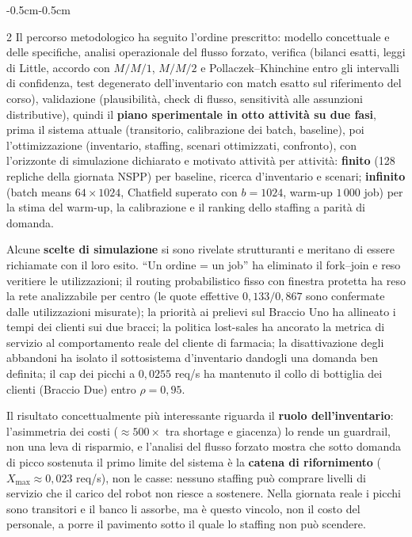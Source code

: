 \documentclass{article}
\begin{document}
\begin{adjustwidth}{-0.5cm}{-0.5cm}
\begin{multicols}{2}
Il percorso metodologico ha seguito l'ordine prescritto: modello concettuale e delle specifiche,
analisi operazionale del flusso forzato, verifica (bilanci esatti, leggi di Little, accordo con
$M/M/1$, $M/M/2$ e Pollaczek--Khinchine entro gli intervalli di confidenza, test degenerato
dell'inventario con match esatto sul riferimento del corso), validazione (plausibilità, check di
flusso, sensitività alle assunzioni distributive), quindi il \textbf{piano sperimentale in otto
attività su due fasi},  prima il sistema attuale (transitorio, calibrazione dei batch,
baseline), poi l'ottimizzazione (inventario, staffing, scenari ottimizzati, confronto),  con
l'orizzonte di simulazione dichiarato e motivato attività per attività: \textbf{finito} (128
repliche della giornata NSPP) per baseline, ricerca d'inventario e scenari; \textbf{infinito}
(batch means $64 \times 1024$, Chatfield superato con $b = 1024$, warm-up $1\,000$ job) per la
stima del warm-up, la calibrazione e il ranking dello staffing a parità di domanda.

Alcune \textbf{scelte di simulazione} si sono rivelate strutturanti e meritano di essere
richiamate con il loro esito. ``Un ordine = un job'' ha eliminato il fork--join e reso veritiere le
utilizzazioni; il routing probabilistico fisso con finestra protetta ha reso la rete analizzabile
per centro (le quote effettive $0{,}133/0{,}867$ sono confermate dalle utilizzazioni misurate);
la priorità ai prelievi sul Braccio Uno ha allineato i tempi dei clienti sui due bracci; la
politica lost-sales ha ancorato la metrica di servizio al comportamento reale del cliente di
farmacia; la disattivazione degli abbandoni ha isolato il sottosistema d'inventario dandogli una
domanda ben definita; il cap dei picchi a $0{,}0255$ req/s ha mantenuto il collo di bottiglia dei
clienti (Braccio Due) entro $\rho = 0{,}95$.

Il risultato concettualmente più interessante riguarda il \textbf{ruolo dell'inventario}:
l'asimmetria dei costi ($\approx 500\times$ tra shortage e giacenza) lo rende un guardrail, non
una leva di risparmio, e l'analisi del flusso forzato mostra che sotto domanda di picco sostenuta
il primo limite del sistema è la \textbf{catena di rifornimento} ($X_{\max} \approx 0{,}023$
req/s), non le casse: nessuno staffing può comprare livelli di servizio che il carico del robot
non riesce a sostenere. Nella giornata reale i picchi sono transitori e il banco li assorbe, 
ma è questo vincolo, non il costo del personale, a porre il pavimento sotto il quale lo staffing
non può scendere.


\end{multicols}
\end{adjustwidth}
\end{document}
